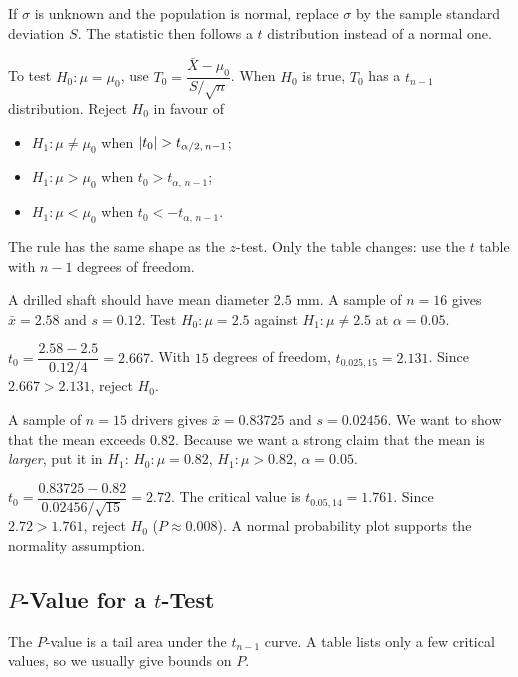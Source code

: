 If $\sigma$ is unknown and the population is normal, replace $\sigma$ by the sample standard deviation $S$. The statistic then follows a $t$ distribution instead of a normal one.

\begin{theorem}\label{thm:ttest}
To test $H_0:\mu=\mu_0$, use $T_0=\dfrac{\bar{X}-\mu_0}{S/\sqrt n}$. When $H_0$ is true, $T_0$ has a $t_{n-1}$ distribution. Reject $H_0$ in favour of
\begin{itemize}
  \item $H_1:\mu\ne\mu_0$ when $\lvert t_0\rvert>t_{\alpha/2,\,n-1}$;
  \item $H_1:\mu>\mu_0$ when $t_0>t_{\alpha,\,n-1}$;
  \item $H_1:\mu<\mu_0$ when $t_0<-t_{\alpha,\,n-1}$.
\end{itemize}
\end{theorem}

The rule has the same shape as the $z$-test. Only the table changes: use the $t$ table with $n-1$ degrees of freedom.

\begin{example}\label{ex:ttest}
A drilled shaft should have mean diameter $2.5$ mm. A sample of $n=16$ gives $\bar{x}=2.58$ and $s=0.12$. Test $H_0:\mu=2.5$ against $H_1:\mu\ne2.5$ at $\alpha=0.05$.

$t_0=\dfrac{2.58-2.5}{0.12/4}=2.667$. With $15$ degrees of freedom, $t_{0.025,15}=2.131$. Since $2.667>2.131$, reject $H_0$.
\end{example}

\begin{example}
A sample of $n=15$ drivers gives $\bar{x}=0.83725$ and $s=0.02456$. We want to show that the mean exceeds $0.82$. Because we want a strong claim that the mean is \emph{larger}, put it in $H_1$: $H_0:\mu=0.82$, $H_1:\mu>0.82$, $\alpha=0.05$.

$t_0=\dfrac{0.83725-0.82}{0.02456/\sqrt{15}}=2.72$. The critical value is $t_{0.05,14}=1.761$. Since $2.72>1.761$, reject $H_0$ ($P\approx0.008$). A normal probability plot supports the normality assumption.
\end{example}

\subsection{$P$-Value for a $t$-Test}

The $P$-value is a tail area under the $t_{n-1}$ curve. A table lists only a few critical values, so we usually give bounds on $P$.

